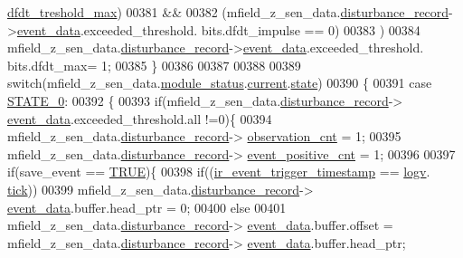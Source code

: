 \begin{DoxyCode}
      \hyperlink{a00021_adf9a37828e447378b1d533185213316d}{dfdt\_treshold\_max})
00381        &&
00382        (mfield\_z\_sen\_data.\hyperlink{a00027_ac9b38e2c1d3f1013a88d33506c754152}{disturbance\_record}->\hyperlink{a00028_a8c0bda69e71ef674e60da47ad0be9ab0}{event\_data}.exceeded\_threshold.
      bits.dfdt\_impulse == 0)
00383         )
00384         mfield\_z\_sen\_data.\hyperlink{a00027_ac9b38e2c1d3f1013a88d33506c754152}{disturbance\_record}->\hyperlink{a00028_a8c0bda69e71ef674e60da47ad0be9ab0}{event\_data}.exceeded\_threshold.
      bits.dfdt\_max= 1;
00385     \}
00386 
00387 
00388 
00389     \textcolor{keywordflow}{switch}(mfield\_z\_sen\_data.\hyperlink{a00027_adfab5a5d8b45a93dfb13edb24e2b80e3}{module\_status}.\hyperlink{a00019_acf41ffc11da291c2f9f0fcb02ee72b98}{current}.\hyperlink{a00019_a6b8d8e916bc56265a3fd279bd26b6d1b}{state})
00390     \{
00391         \textcolor{keywordflow}{case} \hyperlink{a00021_ad6739dbbe5581cac99b7dc8a5e09949c}{STATE\_0}:
00392         \{
00393             \textcolor{keywordflow}{if}(mfield\_z\_sen\_data.\hyperlink{a00027_ac9b38e2c1d3f1013a88d33506c754152}{disturbance\_record}->
      \hyperlink{a00028_a8c0bda69e71ef674e60da47ad0be9ab0}{event\_data}.exceeded\_threshold.all !=0)\{
00394             mfield\_z\_sen\_data.\hyperlink{a00027_ac9b38e2c1d3f1013a88d33506c754152}{disturbance\_record}->
      \hyperlink{a00028_ad5b0bac02ce266b91b2b52a1c3ea1d78}{observation\_cnt}    = 1;
00395             mfield\_z\_sen\_data.\hyperlink{a00027_ac9b38e2c1d3f1013a88d33506c754152}{disturbance\_record}->
      \hyperlink{a00028_a7397b9d76d4b57500f27bb23d258a18a}{event\_positive\_cnt} = 1;
00396 
00397             \textcolor{keywordflow}{if}(save\_event == \hyperlink{a00040_aa8cecfc5c5c054d2875c03e77b7be15d}{TRUE})\{
00398             \textcolor{keywordflow}{if}((\hyperlink{a00017_a6951f534a479b17c02d7da3ad6489634}{ir\_event\_trigger\_timestamp} == \hyperlink{a00021_a2e89c46668b39a17753c238950c9e1ec}{logv}.
      \hyperlink{a00021_a81f0ce68c2c483fb8df726cc1988d8e8}{tick}))
00399                 mfield\_z\_sen\_data.\hyperlink{a00027_ac9b38e2c1d3f1013a88d33506c754152}{disturbance\_record}->
      \hyperlink{a00028_a8c0bda69e71ef674e60da47ad0be9ab0}{event\_data}.buffer.head\_ptr = 0;
00400             \textcolor{keywordflow}{else}
00401                 mfield\_z\_sen\_data.\hyperlink{a00027_ac9b38e2c1d3f1013a88d33506c754152}{disturbance\_record}->
      \hyperlink{a00028_a8c0bda69e71ef674e60da47ad0be9ab0}{event\_data}.buffer.offset = mfield\_z\_sen\_data.\hyperlink{a00027_ac9b38e2c1d3f1013a88d33506c754152}{disturbance\_record}->
      \hyperlink{a00028_a8c0bda69e71ef674e60da47ad0be9ab0}{event\_data}.buffer.head\_ptr;

\end{DoxyCode}
